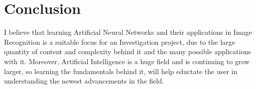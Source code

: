 \documentclass[10pt,a4paper]{article}
\begin{document}
\section{Conclusion}

I believe that learning Artificial Neural Networks and their applications in Image Recognition is a suitable focus for an Investigation project, due to the large 
quantity of content and complexity behind it and the many possible applications with it. Moreover, Artificial Intelligence is a huge field and is continuing to grow 
larger, so learning the fundamentals behind it, will help eductate the user in understanding the newest advancements in the field.
\end{document}
